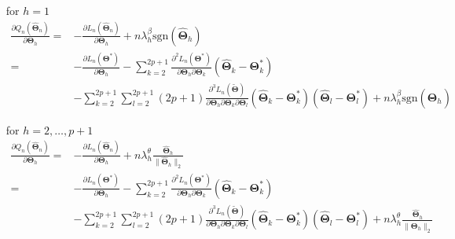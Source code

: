 \documentclass[12pt,letter]{article}\usepackage[]{graphicx}\usepackage[]{color}
\newcommand{\bTheta}{\boldsymbol{\Theta}}
\begin{document}
\begin{itemize}
	\item[for] $h=1$  
	\begin{align*}
	\frac{\partial Q_{n}\left(\widehat{\boldsymbol{\Theta}}_{n}\right)}{\partial\bTheta_{h}}= & -\frac{\partial L_{n}\left(\widehat{\boldsymbol{\Theta}}_{n}\right)}{\partial\bTheta_{h}}+n\lambda_{h}^{\beta}\textrm{sgn}\left(\widehat{\bTheta}_{h}\right)\\
	= & -\frac{\partial L_{n}\left(\boldsymbol{\Theta}^{*}\right)}{\partial\bTheta_{h}}-\sum_{k=2}^{2p+1}\frac{\partial^{2}L_{n}\left(\boldsymbol{\Theta}^{*}\right)}{\partial\bTheta_{h}\partial\bTheta_{k}}\left(\widehat{\bTheta}_{k}-\bTheta_{k}^{*}\right)\\
	& -\sum_{k=2}^{2p+1}\sum_{l=2}^{2p+1}  (2p+1)\frac{\partial^{3}L_{n}(\widetilde{\bTheta})}{\partial\bTheta_{h}\partial\bTheta_{k}\partial\bTheta_{l}}\left(\widehat{\bTheta}_{k}-\bTheta_{k}^{*}\right)\left(\widehat{\bTheta}_{l}-\bTheta_{l}^{*}\right)+n\lambda_{h}^{\beta}\textrm{sgn}\left(\widehat{\bTheta}_{h}\right)
	\end{align*} 
	\item[for] $h=2, \ldots, p+1$ 
	\begin{align*}
	\frac{\partial Q_{n}\left(\widehat{\boldsymbol{\Theta}}_{n}\right)}{\partial\bTheta_{h}}= & -\frac{\partial L_{n}\left(\widehat{\boldsymbol{\Theta}}_{n}\right)}{\partial\bTheta_{h}}+n\lambda_{h}^{\theta}\frac{\widehat{\bTheta}_{h}}{\|\widehat{\bTheta}_{h} \|_2}\\
	= & -\frac{\partial L_{n}\left(\boldsymbol{\Theta}^{*}\right)}{\partial\bTheta_{h}}-\sum_{k=2}^{2p+1}\frac{\partial^{2}L_{n}\left(\boldsymbol{\Theta}^{*}\right)}{\partial\bTheta_{h}\partial\bTheta_{k}}\left(\widehat{\bTheta}_{k}-\bTheta_{k}^{*}\right)\\
	& -\sum_{k=2}^{2p+1}\sum_{l=2}^{2p+1}  (2p+1)\frac{\partial^{3}L_{n}(\widetilde{\bTheta})}{\partial\bTheta_{h}\partial\bTheta_{k}\partial\bTheta_{l}}\left(\widehat{\bTheta}_{k}-\bTheta_{k}^{*}\right)\left(\widehat{\bTheta}_{l}-\bTheta_{l}^{*}\right)+n\lambda_{h}^{\theta}\frac{\widehat{\bTheta}_{h}}{\|\widehat{\bTheta}_{h} \|_2}
	\end{align*} 
\end{itemize}
\end{document}
